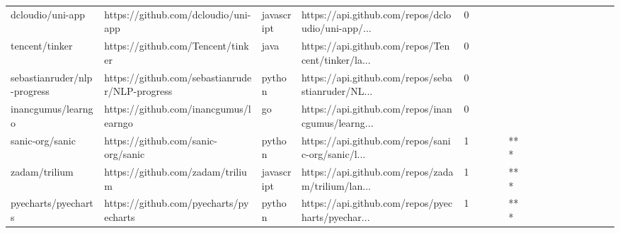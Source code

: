 \begin{tabular}{llllrlllllllllllll}
dcloudio/uni-app                                   &                https://github.com/dcloudio/uni-app &        javascript &  https://api.github.com/repos/dcloudio/uni-app/... &       0 &         &        &           &                &                 &        &           &           &          &          &       &              &          \\
tencent/tinker                                     &                  https://github.com/Tencent/tinker &              java &  https://api.github.com/repos/Tencent/tinker/la... &       0 &         &        &           &                &                 &        &           &           &          &          &       &              &          \\
sebastianruder/nlp-progress                        &     https://github.com/sebastianruder/NLP-progress &            python &  https://api.github.com/repos/sebastianruder/NL... &       0 &         &        &           &                &                 &        &           &           &          &          &       &              &          \\
inancgumus/learngo                                 &              https://github.com/inancgumus/learngo &                go &  https://api.github.com/repos/inancgumus/learng... &       0 &         &        &           &                &                 &        &           &           &          &          &       &              &          \\
sanic-org/sanic                                    &                 https://github.com/sanic-org/sanic &            python &  https://api.github.com/repos/sanic-org/sanic/l... &       1 &         &        &           &            *** &                 &        &           &           &          &          &       &              &          \\
zadam/trilium                                      &                   https://github.com/zadam/trilium &        javascript &  https://api.github.com/repos/zadam/trilium/lan... &       1 &         &        &           &            *** &                 &        &           &           &          &          &       &              &          \\
pyecharts/pyecharts                                &             https://github.com/pyecharts/pyecharts &            python &  https://api.github.com/repos/pyecharts/pyechar... &       1 &         &        &           &            *** &                 &        &           &           &          &          &       &              &          \\

\end{tabular}
